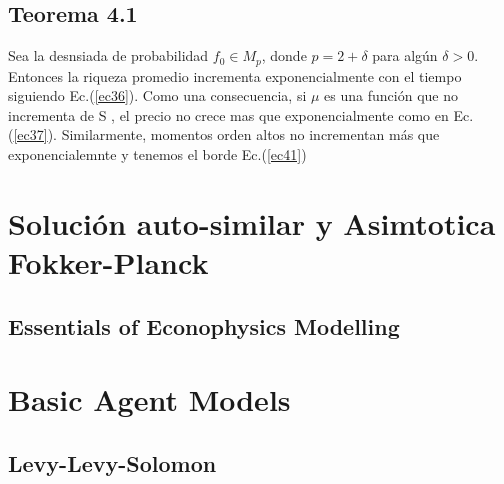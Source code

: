 \documentclass[12pt,a4paper]{article}
\begin{document}
\subsection*{Teorema 4.1}
Sea la desnsiada de probabilidad $f_0\in M_p$, donde $p=2+\delta$ para algún $\delta > 0$. Entonces la riqueza promedio incrementa exponencialmente con el tiempo siguiendo Ec.(\ref{ec36}). Como una consecuencia, si $\mu$ es una función que no incrementa de S
, el precio no crece mas que exponencialmente como en Ec.(\ref{ec37}). Similarmente, momentos orden altos no incrementan más que exponencialemnte y tenemos el borde Ec.(\ref{ec41})
\section*{Solución auto-similar y Asimtotica Fokker-Planck}
\newpage
\begin{center}
\section*{Essentials of Econophysics Modelling\citep{slanina2013}}
\end{center}
\section*{Basic Agent Models}
\subsection*{Levy-Levy-Solomon}
\end{document}
